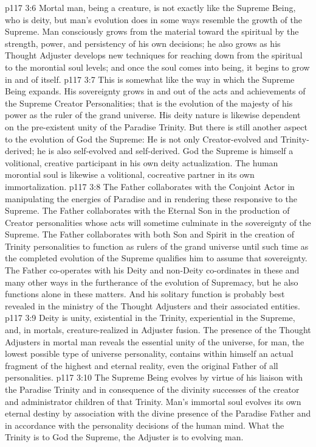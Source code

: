 \vs p117 3:6 Mortal man, being a creature, is not exactly like the Supreme Being, who is deity, but man’s evolution does in some ways resemble the growth of the Supreme. Man consciously grows from the material toward the spiritual by the strength, power, and persistency of his own decisions; he also grows as his Thought Adjuster develops new techniques for reaching down from the spiritual to the morontial soul levels; and once the soul comes into being, it begins to grow in and of itself.
\vs p117 3:7 This is somewhat like the way in which the Supreme Being expands. His sovereignty grows in and out of the acts and achievements of the Supreme Creator Personalities; that is the evolution of the majesty of his power as the ruler of the grand universe. His deity nature is likewise dependent on the pre\hyp{}existent unity of the Paradise Trinity. But there is still another aspect to the evolution of God the Supreme: He is not only Creator\hyp{}evolved and Trinity\hyp{}derived; he is also self\hyp{}evolved and self\hyp{}derived. God the Supreme is himself a volitional, creative participant in his own deity actualization. The human morontial soul is likewise a volitional, cocreative partner in its own immortalization.
\vs p117 3:8 \pc The Father collaborates with the Conjoint Actor in manipulating the energies of Paradise and in rendering these responsive to the Supreme. The Father collaborates with the Eternal Son in the production of Creator personalities whose acts will sometime culminate in the sovereignty of the Supreme. The Father collaborates with both Son and Spirit in the creation of Trinity personalities to function as rulers of the grand universe until such time as the completed evolution of the Supreme qualifies him to assume that sovereignty. The Father co\hyp{}operates with his Deity and non\hyp{}Deity co\hyp{}ordinates in these and many other ways in the furtherance of the evolution of Supremacy, but he also functions alone in these matters. And his solitary function is probably best revealed in the ministry of the Thought Adjusters and their associated entities.
\vs p117 3:9 Deity is unity, existential in the Trinity, experiential in the Supreme, and, in mortals, creature\hyp{}realized in Adjuster fusion. The presence of the Thought Adjusters in mortal man reveals the essential unity of the universe, for man, the lowest possible type of universe personality, contains within himself an actual fragment of the highest and eternal reality, even the original Father of all personalities.
\vs p117 3:10 The Supreme Being evolves by virtue of his liaison with the Paradise Trinity and in consequence of the divinity successes of the creator and administrator children of that Trinity. Man’s immortal soul evolves its own eternal destiny by association with the divine presence of the Paradise Father and in accordance with the personality decisions of the human mind. What the Trinity is to God the Supreme, the Adjuster is to evolving man.
